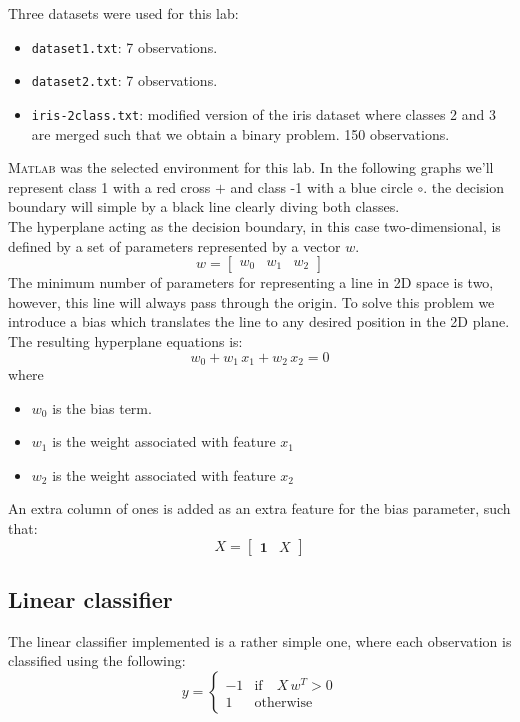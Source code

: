 Three datasets were used for this lab:
\begin{itemize}
	\item \texttt{dataset1.txt}: 7 observations.
	\item \texttt{dataset2.txt}: 7 observations.
	\item \texttt{iris-2class.txt}: modified version of the iris dataset where classes 2 and 3 are merged such that we obtain a binary problem. 150 observations.
\end{itemize}

\textsc{Matlab} was the selected environment for this lab. In the following graphs we'll represent class 1 with a red cross \color{red}$+$ \color{black} and class -1 with a blue circle \color{blue}$\circ$\color{black}. the decision boundary will simple by a black line clearly diving both classes. \\

The hyperplane acting as the decision boundary, in this case two-dimensional, is defined by a set of parameters represented by a vector $w$. 
\begin{equation}
w = \begin{bmatrix} w_0 & w_1 & w_2 \end{bmatrix}
\end{equation}
The minimum number of parameters for representing a line in 2D space is two, however, this line will always pass through the origin. To solve this problem we introduce a bias which translates the line to any desired position in the 2D plane. The resulting hyperplane equations is:
\begin{equation}
w_0 + w_1 \, x_1 + w_2 \, x_2 = 0
\end{equation}
where
\begin{itemize}
	\item $w_0$ is the bias term.
	\item $w_1$ is the weight associated with feature $x_1$
	\item $w_2$ is the weight associated with feature $x_2$
\end{itemize}
An extra column of ones is added as an extra feature for the bias parameter, such that:
\begin{equation}
X = \begin{bmatrix} \mathbf{1} & X \end{bmatrix}
\end{equation}

\subsection{Linear classifier}
The linear classifier implemented is a rather simple one, where each observation is classified using the following:
\begin{equation}
y = \begin{cases}
-1 & \text{if} \quad X \, w^T > 0 \\
1 & \text{otherwise}
\end{cases}
\end{equation}

